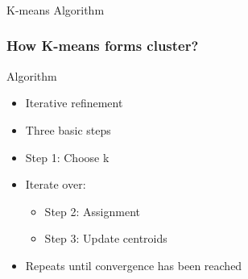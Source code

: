 \begin{frame}[fragile]\frametitle{}
\begin{center}
{\Large K-means Algorithm}
\end{center}
\end{frame}

\begin{frame}[fragile]\frametitle{How  K-means forms cluster?}
Algorithm
\begin{itemize}
\item  Iterative refinement
\item  Three basic steps
\item  Step 1: Choose k
\item  Iterate over:
\begin{itemize}
\item  Step 2: Assignment
\item  Step 3: Update centroids
\end{itemize}
\item  Repeats until convergence has been reached
\end{itemize}
\end{frame}



